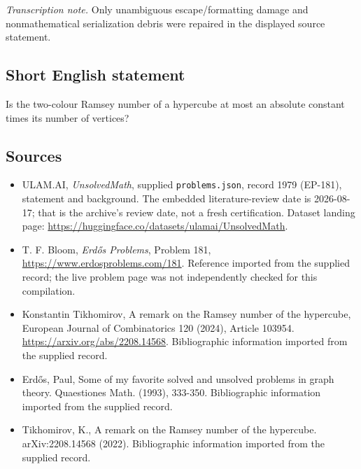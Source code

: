 \documentclass[11pt,a4paper]{article}
\begin{document}
{\small\emph{Transcription note.} Only unambiguous escape/formatting damage and nonmathematical serialization debris were repaired in the displayed source statement.}

\subsection{Short English statement}

Is the two-colour Ramsey number of a hypercube at most an absolute constant times its number of vertices?

\subsection{Sources}

{\small

\begin{itemize}

\item[\hypertarget{source:1979:1}{S1}] ULAM.AI, \emph{UnsolvedMath}, supplied \texttt{problems.json}, record 1979 (EP-181), statement and background. The embedded literature-review date is 2026-08-17; that is the archive’s review date, not a fresh certification. Dataset landing page: \url{https://huggingface.co/datasets/ulamai/UnsolvedMath}.

\item[\hypertarget{source:1979:2}{S2}] T. F. Bloom, \emph{Erdős Problems}, Problem 181, \url{https://www.erdosproblems.com/181}. Reference imported from the supplied record; the live problem page was not independently checked for this compilation.

\item[\hypertarget{source:1979:3}{S3}] Konstantin Tikhomirov, A remark on the Ramsey number of the hypercube, European Journal of Combinatorics 120 (2024), Article 103954. \url{https://arxiv.org/abs/2208.14568}. Bibliographic information imported from the supplied record.

\item[\hypertarget{source:1979:4}{S4}] Erd\H{o}s, Paul, Some of my favorite solved and unsolved problems in graph theory. Quaestiones Math. (1993), 333-350. Bibliographic information imported from the supplied record.

\item[\hypertarget{source:1979:5}{S5}] Tikhomirov, K., A remark on the Ramsey number of the hypercube. arXiv:2208.14568 (2022). Bibliographic information imported from the supplied record.

\end{itemize}

}

\label{end:1979}
\end{document}
